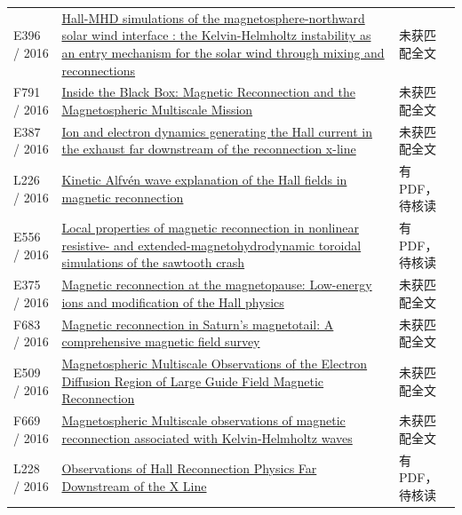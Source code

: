 \documentclass[UTF8,a4paper,11pt,openany,fontset=fandol]{ctexbook}
\begin{document}
\begin{longtable}{P{24mm}P{97mm}P{27mm}}
E396 / 2016 & \href{https://ui.adsabs.harvard.edu/abs/2016EGUGA..18.9105L/abstract}{Hall-MHD simulations of the magnetosphere-northward solar wind interface : the Kelvin-Helmholtz instability as an entry mechanism for the solar wind through mixing and reconnections} & 未获匹配全文\\

F791 / 2016 & \href{https://doi.org/10.1002/2015sw001313}{Inside the Black Box: Magnetic Reconnection and the Magnetospheric Multiscale Mission} & 未获匹配全文\\

E387 / 2016 & \href{https://doi.org/10.1063/1.4940322}{Ion and electron dynamics generating the Hall current in the exhaust far downstream of the reconnection x-line} & 未获匹配全文\\

L226 / 2016 & \href{https://doi.org/10.1002/2016gl071044}{Kinetic Alfvén wave explanation of the Hall fields in magnetic reconnection} & 有PDF，待核读\\

E556 / 2016 & \href{https://doi.org/10.1088/1361-6587/59/2/025007}{Local properties of magnetic reconnection in nonlinear resistive- and extended-magnetohydrodynamic toroidal simulations of the sawtooth crash} & 有PDF，待核读\\

E375 / 2016 & \href{https://ui.adsabs.harvard.edu/abs/2016EGUGA..1813235A/abstract}{Magnetic reconnection at the magnetopause: Low-energy ions and modification of the Hall physics} & 未获匹配全文\\

F683 / 2016 & \href{https://doi.org/10.1002/2015ja022005}{Magnetic reconnection in Saturn's magnetotail: A comprehensive magnetic field survey} & 未获匹配全文\\

E509 / 2016 & \href{https://doi.org/10.1103/physrevlett.117.015001}{Magnetospheric Multiscale Observations of the Electron Diffusion Region of Large Guide Field Magnetic Reconnection} & 未获匹配全文\\

F669 / 2016 & \href{https://doi.org/10.1002/2016gl068783}{Magnetospheric Multiscale observations of magnetic reconnection associated with Kelvin‐Helmholtz waves} & 未获匹配全文\\

L228 / 2016 & \href{https://doi.org/10.1103/physrevlett.117.185102}{Observations of Hall Reconnection Physics Far Downstream of the X Line} & 有PDF，待核读\\


\end{longtable}
\end{document}
